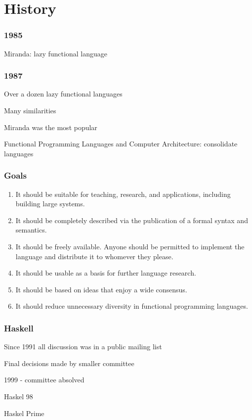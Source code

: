 \section{History}

\frame{\sectionpage}

\begin{frame}
\frametitle{1985}

Miranda: lazy functional language
\end{frame}

\begin{frame}
\frametitle{1987}

Over a dozen lazy functional languages

Many similarities

Miranda was the most popular

Functional Programming Languages and Computer Architecture: consolidate languages
\end{frame}

\begin{frame}
\frametitle{Goals}

\begin{enumerate}
\item It should be suitable for teaching, research, and applications,
  including building large systems.
\item It should be completely described via the publication of a
  formal syntax and semantics.
\item It should be freely available. Anyone should be permitted to
  implement the language and distribute it to whomever they please.
\item It should be usable as a basis for further language research.
\item It should be based on ideas that enjoy a wide consensus.
\item It should reduce unnecessary diversity in functional programming
  languages.
\end{enumerate}
\end{frame}

\begin{frame}
\frametitle{Haskell}

Since 1991 all discussion was in a public mailing list

Final decisions made by smaller committee

1999 - committee absolved

Haskel 98

Haskel Prime
\end{frame}
